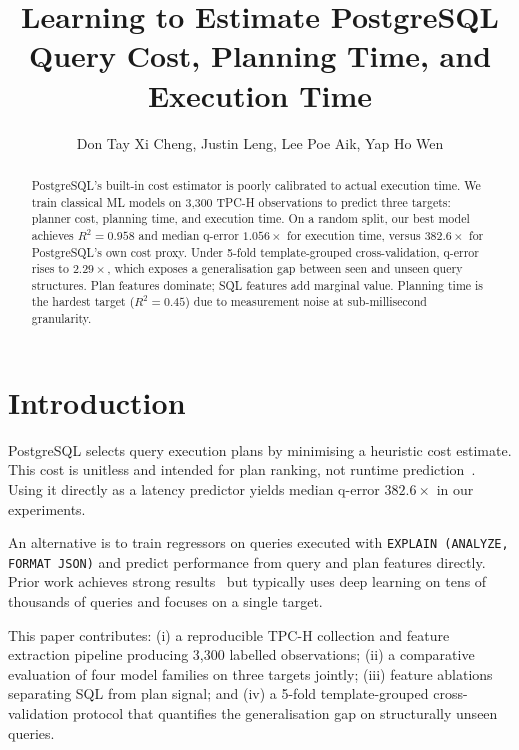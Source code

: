 \documentclass[runningheads]{llncs}
\begin{document}
\title{Learning to Estimate PostgreSQL Query Cost, Planning Time, and Execution Time}

\author{%
  Don Tay Xi Cheng, Justin Leng, Lee Poe Aik, Yap Ho Wen
}

\maketitle

\begin{abstract}
PostgreSQL's built-in cost estimator is poorly calibrated to actual
execution time.
We train classical ML models on 3,300 TPC-H observations to predict three
targets: planner cost, planning time, and execution time.
On a random split, our best model achieves $R^2 = 0.958$ and median
q-error $1.056\times$ for execution time, versus $382.6\times$ for
PostgreSQL's own cost proxy.
Under 5-fold template-grouped cross-validation, q-error rises to
$2.29\times$, which exposes a generalisation gap between seen and unseen
query structures.
Plan features dominate; SQL features add marginal value.
Planning time is the hardest target ($R^2 = 0.45$) due to measurement
noise at sub-millisecond granularity.
\end{abstract}

\section{Introduction}

PostgreSQL selects query execution plans by minimising a heuristic cost
estimate.
This cost is unitless and intended for plan ranking, not runtime
prediction~\cite{postgresql}.
Using it directly as a latency predictor yields median q-error
$382.6\times$ in our experiments.

An alternative is to train regressors on queries executed with
\texttt{EXPLAIN (ANALYZE, FORMAT JSON)} and predict performance from
query and plan features directly.
Prior work achieves strong results~\cite{marcus2019,zhao2022} but
typically uses deep learning on tens of thousands of queries and focuses
on a single target.

This paper contributes: (i) a reproducible TPC-H collection and feature
extraction pipeline producing 3,300 labelled observations; (ii) a
comparative evaluation of four model families on three targets jointly;
(iii) feature ablations separating SQL from plan signal; and (iv) a
5-fold template-grouped cross-validation protocol that quantifies the
generalisation gap on structurally unseen queries.
\end{document}
